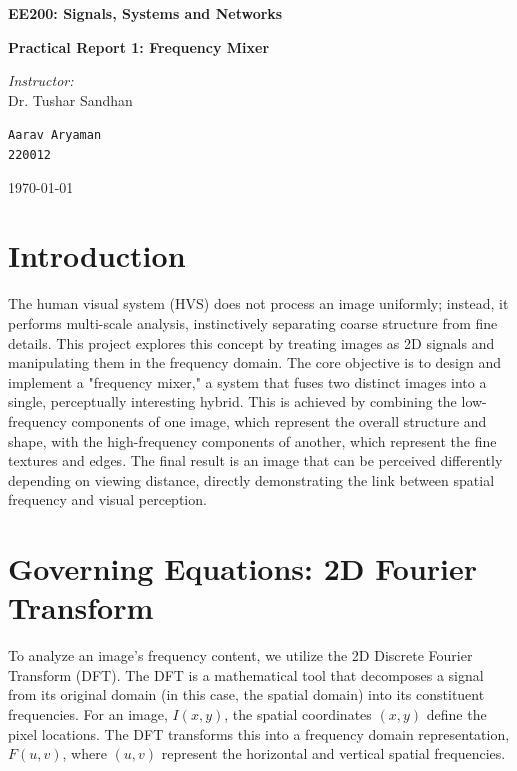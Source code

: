 \documentclass[11pt, a4paper]{article}
\begin{document}
\begin{titlepage}
    \centering
    \vspace*{\fill}
    {\Huge\bfseries EE200: Signals, Systems and Networks\par}
    \vspace{1.5cm}
    {\Large\bfseries Practical Report 1: Frequency Mixer\par}
    \vspace{2cm}
    
    \large\emph{Instructor:}\\ Dr. Tushar Sandhan
    
    \vfill
    {\large \texttt{Aarav Aryaman} \\ \texttt{220012}}\par
    \vspace*{1cm}
    {\large \today\par}
\end{titlepage}

\tableofcontents
\newpage

\section{Introduction}
The human visual system (HVS) does not process an image uniformly; instead, it performs multi-scale analysis, instinctively separating coarse structure from fine details. This project explores this concept by treating images as 2D signals and manipulating them in the frequency domain. The core objective is to design and implement a "frequency mixer," a system that fuses two distinct images into a single, perceptually interesting hybrid. This is achieved by combining the low-frequency components of one image, which represent the overall structure and shape, with the high-frequency components of another, which represent the fine textures and edges. The final result is an image that can be perceived differently depending on viewing distance, directly demonstrating the link between spatial frequency and visual perception.

\section{Governing Equations: 2D Fourier Transform}
To analyze an image's frequency content, we utilize the 2D Discrete Fourier Transform (DFT). The DFT is a mathematical tool that decomposes a signal from its original domain (in this case, the spatial domain) into its constituent frequencies. For an image, \(I(x,y)\), the spatial coordinates \((x,y)\) define the pixel locations. The DFT transforms this into a frequency domain representation, \(F(u,v)\), where \((u,v)\) represent the horizontal and vertical spatial frequencies.
\end{document}
